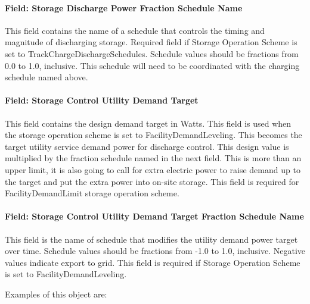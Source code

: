 \paragraph{Field: Storage Discharge Power Fraction Schedule Name}\label{field-storage-discharge-power-fraction-schedule-name}

This field contains the name of a schedule that controls the timing and magnitude of discharging storage. Required field if Storage Operation Scheme is set to TrackChargeDischargeSchedules. Schedule values should be fractions from 0.0 to 1.0, inclusive. This schedule will need to be coordinated with the charging schedule named above.

\paragraph{Field: Storage Control Utility Demand Target}\label{field-storage-control-utility-demand-target}

This field contains the design demand target in Watts. This field is used when the storage operation scheme is set to FacilityDemandLeveling. This becomes the target utility service demand power for discharge control. This design value is multiplied by the fraction schedule named in the next field. This is more than an upper limit, it is also going to call for extra electric power to raise demand up to the target and put the extra power into on-site storage. This field is required for FacilityDemandLimit storage operation scheme.

\paragraph{Field: Storage Control Utility Demand Target Fraction Schedule Name}\label{field-storage-control-utility-demand-target-fraction-schedule-name}

This field is the name of schedule that modifies the utility demand power target over time. Schedule values should be fractions from -1.0 to 1.0, inclusive. Negative values indicate export to grid. This field is required if Storage Operation Scheme is set to FacilityDemandLeveling.

Examples of this object are:

